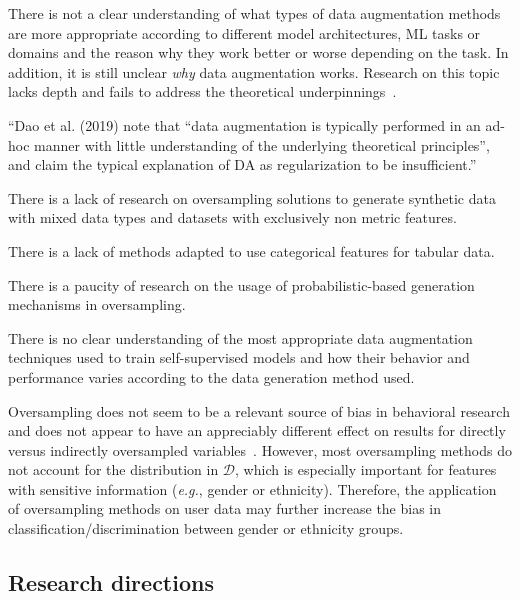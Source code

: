 \documentclass[parskip=full]{scrartcl}
\begin{document}
There is not a clear understanding of what types of data augmentation methods
are more appropriate according to different model architectures, ML tasks or
domains and the reason why they work better or worse depending on the task. 
In addition, it is still unclear \textit{why} data augmentation works.
Research on this topic lacks depth and fails to address the theoretical
underpinnings~\cite{feng2021survey}.

``Dao et al. (2019) note that ``data augmentation is typically performed in an
ad-hoc manner with little understanding of the underlying theoretical
principles'', and claim the typical explanation of DA as regularization to be
insufficient.''~\cite{feng2021survey}

There is a lack of research on oversampling solutions to generate synthetic
data with mixed data types and datasets with exclusively non metric features.

There is a lack of methods adapted to use categorical features for tabular
data.

There is a paucity of research on the usage of probabilistic-based generation
mechanisms in oversampling.



There is no clear understanding of the most appropriate data augmentation
techniques used to train self-supervised models and how their behavior and
performance varies according to the data generation method used.


Oversampling does not seem to be a relevant source of bias in behavioral
research and does not appear to have an appreciably different effect on
results for directly versus indirectly oversampled
variables~\cite{hauner2014latent}. However, most oversampling methods do not
account for the distribution in $\mathcal{D}$, which is especially important
for features with sensitive information (\textit{e.g.}, gender or ethnicity).
Therefore, the application of oversampling methods on user data may further
increase the bias in classification/discrimination between gender or ethnicity
groups.


\subsection{Research directions}
\end{document}
